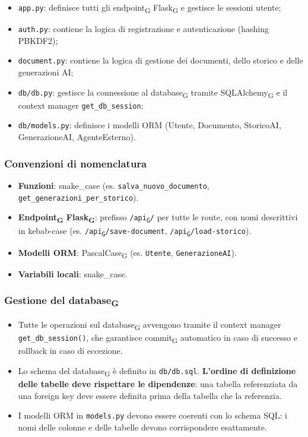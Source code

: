 \documentclass[11pt,a4paper]{article}
\newcommand{\gls}[1]{#1\textsubscript{G}}
\begin{document}
\begin{itemize}
    \item \texttt{app.py}: definisce tutti gli \gls{endpoint} \gls{Flask} e gestisce le sessioni utente;
    \item \texttt{auth.py}: contiene la logica di registrazione e autenticazione (hashing PBKDF2);
    \item \texttt{document.py}: contiene la logica di gestione dei documenti, dello storico e delle generazioni AI;
    \item \texttt{db/db.py}: gestisce la connessione al \gls{database} tramite \gls{SQLAlchemy} e il context manager \texttt{get\_db\_session};
    \item \texttt{db/models.py}: definisce i modelli ORM (Utente, Documento, StoricoAI, GenerazioneAI, AgenteEsterno).
\end{itemize}
 
\subsubsection{Convenzioni di nomenclatura}
 
\begin{itemize}
    \item \textbf{Funzioni}: snake\_case (es. \texttt{salva\_nuovo\_documento}, \texttt{get\_generazioni\_per\_storico}).
    \item \textbf{\gls{Endpoint} \gls{Flask}}: prefisso \texttt{/\gls{api}/} per tutte le route, con nomi descrittivi in kebab-case (es. \texttt{/\gls{api}/save-document}, \texttt{/\gls{api}/load-storico}).
    \item \textbf{Modelli ORM}: \gls{PascalCase} (es. \texttt{Utente}, \texttt{GenerazioneAI}).
    \item \textbf{Variabili locali}: snake\_case.
\end{itemize}
 
\subsubsection{Gestione del \gls{database}}
 
\begin{itemize}
    \item Tutte le operazioni sul \gls{database} avvengono tramite il context manager \texttt{get\_db\_session()}, che garantisce \gls{commit} automatico in caso di successo e rollback in caso di eccezione.
    \item Lo schema del \gls{database} è definito in \texttt{db/db.sql}. \textbf{L'ordine di definizione delle tabelle deve rispettare le dipendenze}: una tabella referenziata da una foreign key deve essere definita prima della tabella che la referenzia.
    \item I modelli ORM in \texttt{models.py} devono essere coerenti con lo schema SQL: i nomi delle colonne e delle tabelle devono corrispondere esattamente.
\end{itemize}
 
\end{document}
